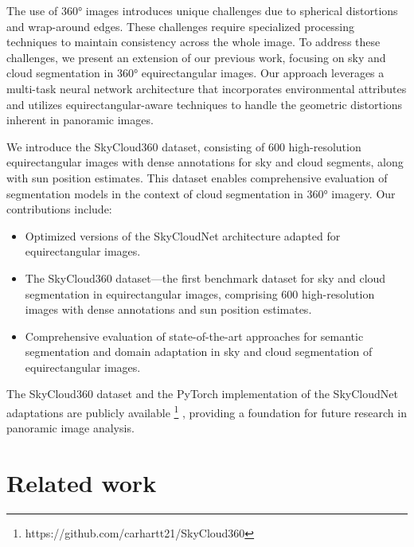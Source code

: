 \documentclass[conference]{IEEEtran}
\begin{document}
The use of 360° images introduces unique challenges due to spherical distortions and wrap-around edges. 
These challenges require specialized processing techniques to maintain consistency across the whole image. 
To address these challenges, we present an extension of our previous work, focusing on sky and cloud segmentation in 360° equirectangular images. Our approach leverages a multi-task neural network architecture that incorporates environmental attributes and utilizes equirectangular-aware techniques to handle the geometric distortions inherent in panoramic images.

We introduce the SkyCloud360 dataset, consisting of 600 high-resolution equirectangular images with dense annotations for sky and cloud segments, along with sun position estimates. 
This dataset enables comprehensive evaluation of segmentation models in the context of cloud segmentation in 360° imagery. Our contributions include:

\begin{itemize}
    \item Optimized versions of the SkyCloudNet architecture adapted for equirectangular images.
    \item The SkyCloud360 dataset—the first benchmark dataset for sky and cloud segmentation in equirectangular images, comprising 600 high-resolution images with dense annotations and sun position estimates.
    \item Comprehensive evaluation of state-of-the-art approaches for semantic segmentation and domain adaptation in sky and cloud segmentation of equirectangular images.
\end{itemize}

The SkyCloud360 dataset and the PyTorch implementation of the SkyCloudNet adaptations are publicly available \footnote{https://github.com/carhartt21/SkyCloud360}
, providing a foundation for future research in panoramic image analysis. 


 
 
\section{Related work}\label{sec:related_work}
\end{document}
